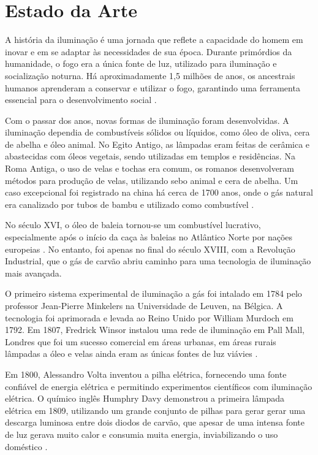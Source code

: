 % 
% 

\chapter{Estado da Arte}

A história da iluminação é uma jornada que reflete a capacidade do homem em inovar e em se adaptar às necessidades de sua época. Durante primórdios da humanidade, o fogo era a única fonte de luz, utilizado para iluminação e socialização noturna. Há aproximadamente 1,5 milhões de anos, os ancestrais humanos aprenderam a conservar e utilizar o fogo, garantindo uma ferramenta essencial para o desenvolvimento social \cite{Guarnieri2015}.

Com o passar dos anos, novas formas de iluminação foram desenvolvidas. A iluminação dependia de combustíveis sólidos ou líquidos, como óleo de oliva, cera de abelha e óleo animal. No Egito Antigo, as lâmpadas eram feitas de cerâmica e abastecidas com óleos vegetais, sendo utilizadas em templos e residências. Na Roma Antiga, o uso de velas e tochas era comum, os romanos desenvolveram métodos para produção de velas, utilizando sebo animal e cera de abelha. Um caso excepcional foi registrado na china há cerca de 1700 anos, onde o gás natural era canalizado por tubos de bambu e utilizado como combustível \cite{James1995}. 

No século XVI, o óleo de baleia tornou-se um combustível lucrativo, especialmente após o início da caça às baleias no Atlântico Norte por nações europeias \cite{Proulx1968}. No entanto, foi apenas no final do século XVIII, com a Revolução Industrial, que o gás de carvão abriu caminho para uma tecnologia de iluminação mais avançada.

O primeiro sistema experimental de iluminação a gás foi intalado em 1784 pelo professor Jean-Pierre Minkelers na Universidade de Leuven, na Bélgica. A tecnologia foi aprimorada e levada ao Reino Unido por William Murdoch em 1792. Em 1807, Fredrick Winsor instalou uma rede de iluminação em Pall Mall, Londres que foi um sucesso comercial em áreas urbanas, em áreas rurais lâmpadas a óleo e velas ainda eram as únicas fontes de luz viávies \cite{Penzel1978}.

Em 1800, Alessandro Volta inventou a pilha elétrica, fornecendo uma fonte confiável de energia elétrica e permitindo experimentos científicos com iluminação elétrica. O químico inglês Humphry Davy demonstrou a primeira lâmpada elétrica em 1809, utilizando um grande conjunto de pilhas para gerar gerar uma descarga luminosa entre dois diodos de carvão, que apesar de uma intensa fonte de luz gerava muito calor e consumia muita energia, inviabilizando o uso doméstico \cite{Dredge2014}.

